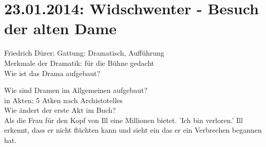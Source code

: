 \documentclass[a4paper]{article}
\begin{document}
\section{23.01.2014: Widschwenter - Besuch der alten Dame}

Friedrich Dürer; Gattung: Dramatisch, Aufführung\\
Merkmale der Dramatik: für die Bühne gedacht\\
Wie ist das Drama aufgebaut?

Wie sind Dramen im Allgemeinen aufgebaut?\\
in Akten; 5 Atken nach Archistotelles\\
Wie ändert der erste Akt im Buch?\\
Als die Frau für den Kopf von Ill eine Millionen bietet. 'Ich bin verloren.' Ill erkennt, dass er nicht flüchten kann und sieht ein das er ein Verbrechen begannen hat.
\end{document}
